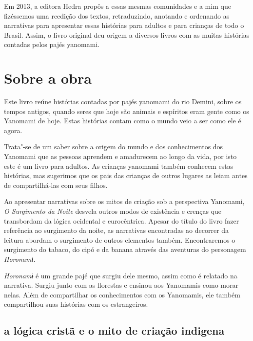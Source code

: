 Em 2013, a editora Hedra propôs a essas mesmas comunidades e a mim que
fizéssemos uma reedição dos textos, retraduzindo, anotando e ordenando as
narrativas para apresentar essas histórias para adultos e para crianças de todo
o Brasil. Assim, o livro original deu origem a diversos livros com as muitas
histórias contadas pelos pajés yanomami.  

\section{Sobre a obra}

Este livro reúne histórias contadas por pajés yanomami do rio Demini, sobre os tempos antigos, quando seres que hoje são animais e espíritos eram gente como os Yanomami de hoje. Estas histórias contam como o mundo veio a ser como ele é agora. 

Trata"-se de um saber sobre a origem do mundo e dos conhecimentos dos Yanomami que as pessoas aprendem e amadurecem ao longo da vida, por isto este é um livro para adultos. As crianças yanomami também conhecem estas histórias, mas sugerimos que os pais das crianças de outros lugares as leiam antes de compartilhá-las com seus filhos.


Ao apresentar narrativas sobre os mitos de criação sob a perspectiva
Yanomami, \emph{O Surgimento da Noite} desvela outros modos de existência
e crenças que transbordam da lógica ocidental e eurocêntrica.
Apesar do título do livro fazer referência ao surgimento da noite, as
narrativas encontradas ao decorrer da leitura abordam o surgimento de
outros elementos também. Encontraremos o surgimento do tabaco, do cipó e
da banana através das aventuras do personagem \emph{Horonamɨ.}

\emph{Horonamɨ} é um grande pajé que surgiu dele mesmo, assim como é
relatado na narrativa. Surgiu junto com as florestas e ensinou aos
Yanomamis como morar nelas. Além de compartilhar os conhecimentos com os
Yanomamis, ele também compartilhou suas histórias com os estrangeiros.



\subsection{a lógica cristã e o mito de criação indigena}

